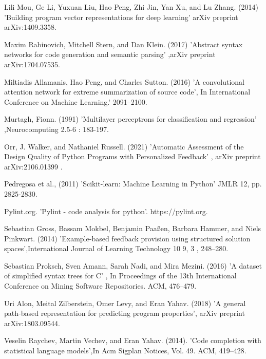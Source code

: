\documentclass[a4paper, 14pt, oneside]{Thesis}
\begin{document}
\begin{thebibliography}{99}
 Lili Mou, Ge Li, Yuxuan Liu, Hao Peng, Zhi Jin, Yan Xu, and Lu Zhang. (2014) 'Building program vector representations for deep learning' arXiv preprint arXiv:1409.3358.

 Maxim Rabinovich, Mitchell Stern, and Dan Klein. (2017) 'Abstract syntax networks for code generation and semantic parsing' ,arXiv preprint arXiv:1704.07535.

 Miltiadis Allamanis, Hao Peng, and Charles Sutton. (2016) 'A convolutional attention network for extreme summarization of source code', In International Conference on Machine Learning.' 2091–2100.

 Murtagh, Fionn. (1991) 'Multilayer perceptrons for classification and regression' ,Neurocomputing 2.5-6 : 183-197.

Orr, J. Walker, and Nathaniel Russell. (2021) 'Automatic Assessment of the Design Quality of Python Programs with Personalized Feedback' , arXiv preprint arXiv:2106.01399 .

 Pedregosa et al.,  (2011) 'Scikit-learn: Machine Learning in Python' JMLR 12, pp. 2825-2830.

 Pylint.org. 'Pylint - code analysis for python'. https://pylint.org.

 Sebastian Gross, Bassam Mokbel, Benjamin Paaßen, Barbara Hammer, and Niels Pinkwart. (2014) 'Example-based feedback provision using structured solution spaces',International Journal of Learning Technology 10 9, 3 , 248–280.

 Sebastian Proksch, Sven Amann, Sarah Nadi, and Mira Mezini. (2016) 'A dataset of simplified syntax trees for C' , In Proceedings of the 13th International Conference on Mining Software Repositories. ACM, 476–479.

 Uri Alon, Meital Zilberstein, Omer Levy, and Eran Yahav. (2018) 'A general path-based representation for predicting program properties', arXiv preprint arXiv:1803.09544.

 Veselin Raychev, Martin Vechev, and Eran Yahav. (2014). 'Code completion with statistical language models',In Acm Sigplan Notices, Vol. 49. ACM, 419–428.


\end{thebibliography}
\end{document}
